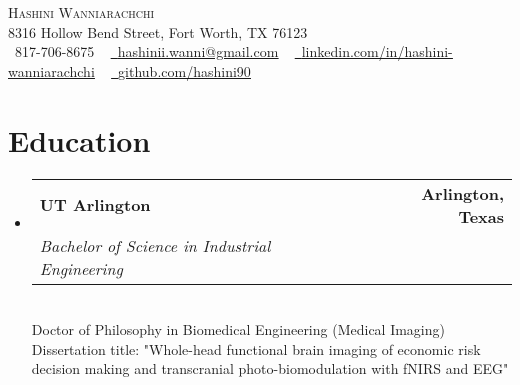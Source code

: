 \documentclass[letterpaper,11pt]{article}
\makeatletter
\newcommand{\resumeSubheading}[4]{
  \vspace{-2pt}\item
    \begin{tabular*}{1.0\textwidth}[t]{l@{\extracolsep{\fill}}r}
      \textbf{#1} & \textbf{\small #2} \\
      \textit{\small#3} & \textit{\small #4} \\
    \end{tabular*}\vspace{-7pt}
}
\newcommand{\resumeSubHeadingListStart}{\begin{itemize}[leftmargin=0.0in, label={}]}
\newcommand{\resumeSubHeadingListEnd}{\end{itemize}}
\makeatother
\begin{document}

\begin{center}
    {\Huge \scshape Hashini Wanniarachchi} \\ \vspace{1pt}
    8316 Hollow Bend Street, Fort Worth, TX 76123 \\ \vspace{1pt}
    \small \raisebox{-0.1\height}\faPhone\ 817-706-8675 ~ \href{mailto:Hashinii.wanni@gmail.com}{\raisebox{-0.2\height}\faEnvelope\  \underline{hashinii.wanni@gmail.com}} ~ 
    \href{https://linkedin.com/in//}{\raisebox{-0.2\height}\faLinkedin\ \underline{linkedin.com/in/hashini-wanniarachchi}}  ~
    \href{https://github.com/}{\raisebox{-0.2\height}\faGithub\ \underline{github.com/hashini90}}
    \vspace{-8pt}
\end{center}


\section{Education}
  \resumeSubHeadingListStart
    \resumeSubheading
      {UT Arlington}{Arlington, Texas}
      {Bachelor of Science in Industrial Engineering}{}\\ \vspace{5pt}
      {Doctor of Philosophy in Biomedical Engineering (Medical Imaging)}\\
      {Dissertation title: "Whole-head functional brain imaging of economic risk decision making and transcranial photo-biomodulation with fNIRS and EEG"}
  \resumeSubHeadingListEnd
\end{document}
